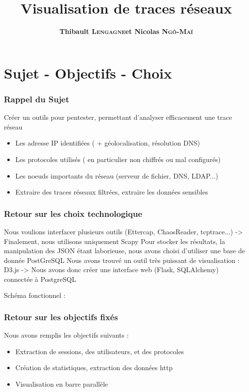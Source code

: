 \documentclass{beamer}
\title[Visualisation de traces réseaux]{Visualisation de traces réseaux}
\author{\textbf{Thibault \textsc{Lengagne}et Nicolas \textsc{Ngô-Maï}}}
\institute{Centrale Supélec - Campus de Rennes}
\begin{document}
  \begin{frame}
    \titlepage
  \end{frame}
  

 \section{Sujet - Objectifs - Choix}
  \begin{frame}
   \frametitle{Rappel du Sujet}
   Créer un outils pour pentester, permettant d'analyser efficacement une trace réseau
   \begin{itemize}
    \item Les adresse IP identifiées ( + géolocalisation, résolution DNS)
    \item Les protocoles utilisés ( en particulier non chiffrés ou mal configurés)
    \item Les noeuds importants du réseau (serveur de fichier, DNS, LDAP...)
    \item Extraire des traces réseaux filtrées, extraire les données sensibles
   \end{itemize}
  \end{frame}
  
  \begin{frame}
   \frametitle{Retour sur les choix technologique}
   Nous voulions interfacer plusieurs outils (Ettercap, ChaosReader, tcptrace...)
   -> Finalement, nous utilisons uniquement Scapy
   Pour stocker les résultats, la manipulation des JSON étant laborieuse, nous avons choisi d'utiliser une base de donnée PostGreSQL
   Nous avons trouvé un outil très puissant de visualisation : D3.js
   -> Nous avons donc créer une interface web (Flask, SQLAlchemy) connectée à PostgreSQL
  \end{frame}
  
  \begin{frame}
   Schéma fonctionnel :
  \end{frame}

  \begin{frame}
     \frametitle{Retour sur les objectifs fixés}
    Nous avons remplis les objectifs suivants :
    \begin{itemize}
     \item Extraction de sessions, des utilisateurs, et des protocoles
     \item Création de statistiques, extraction des données http
     \item Visualisation en barre parallèle
    \end{itemize}
  \end{frame}
  
\end{document}
